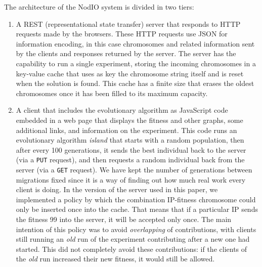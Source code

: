 \documentclass[runningheads,a4paper]{llncs}\usepackage[]{graphicx}\usepackage[]{color}
\begin{document}
The architecture of the {\sf NodIO} system is divided in two tiers:\begin{enumerate}
\item A REST (representational state transfer) server that responds to
  HTTP requests made by the browsers. These HTTP requests use JSON for information 
  encoding, in this case chromosomes and related
  information sent by the clients and responses returned by the
  server.  The server has the capability to
  run a single experiment, storing the incoming chromosomes in a
  key-value cache that uses as key the chromosome string itself and is
  reset when the solution is found. This cache has a finite 
  size that erases the oldest chromosomes once it has been filled to %
  its maximum capacity.  
\item A client that includes the evolutionary algorithm as
  JavaScript code embedded in a web page that displays the fitness and
  other graphs, some
  additional links, and information on the experiment. 
  This code runs
  an evolutionary algorithm {\em island} that starts with a random
  population, then after every 100 generations, it sends the best individual
  back to the server (via a {\tt PUT} request), and then requests a random
  individual back from the server (via a {\tt GET} request). We have
  kept the number of generations between migrations fixed since it is
  a way of finding out how much real work every client is doing. In
  the version of the server used in this paper, we implemented a
  policy by which the combination IP-fitness chromosome could only be
  inserted once into the cache. That means that if a particular IP
  sends the fitness 99 into the server, it will be accepted only
  once. The main intention of this policy was to avoid {\em
    overlapping} of contributions, with clients still running an {\em
    old} run of the experiment contributing after a new one had
  started. This did not completely avoid these contributions: if the
  clients of the {\em old} run increased their new fitness, it would
  still be allowed. 
\end{enumerate}
\end{document}
